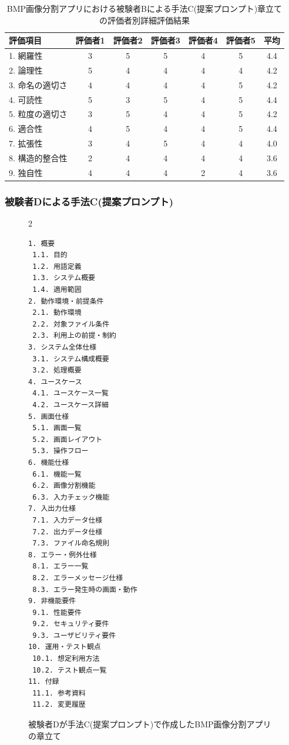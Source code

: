 \begin{table}[tp]
  \caption{BMP画像分割アプリにおける被験者Bによる手法C(提案プロンプト)章立ての評価者別詳細評価結果}
  \label{tb:detailed_evaluation_results_C}
  \centering
  \begin{tabular}{|l|c|c|c|c|c|c|}
    \hline
    \textbf{評価項目} & \textbf{評価者1} & \textbf{評価者2} & \textbf{評価者3} & \textbf{評価者4} & \textbf{評価者5} & \textbf{平均} \\
    \hline\hline
    1. 網羅性 & 3 & 5 & 5 & 4 & 5 & 4.4 \\
    \hline
    2. 論理性 & 5 & 4 & 4 & 4 & 4 & 4.2 \\
    \hline
    3. 命名の適切さ & 4 & 4 & 4 & 4 & 5 & 4.2 \\
    \hline
    4. 可読性 & 5 & 3 & 5 & 4 & 5 & 4.4 \\
    \hline
    5. 粒度の適切さ & 3 & 5 & 4 & 4 & 5 & 4.2 \\
    \hline
    6. 適合性 & 4 & 5 & 4 & 4 & 5 & 4.4 \\
    \hline
    7. 拡張性 & 3 & 4 & 5 & 4 & 4 & 4.0 \\
    \hline
    8. 構造的整合性 & 2 & 4 & 4 & 4 & 4 & 3.6 \\
    \hline
    9. 独自性 & 4 & 4 & 4 & 2 & 4 & 3.6 \\
    \hline
  \end{tabular}
\end{table}




\subsubsection{被験者Dによる手法C(提案プロンプト)}

\begin{figure}[tp]
\begin{tcolorbox}[
  colback=white,
  colframe=orange,
  fonttitle=\bfseries
]
\begin{multicols}{2}
\footnotesize
\ttfamily
\fontsize{8}{9}\selectfont
\begin{verbatim}
1. 概要
 1.1. 目的
 1.2. 用語定義
 1.3. システム概要
 1.4. 適用範囲
2. 動作環境・前提条件
 2.1. 動作環境
 2.2. 対象ファイル条件
 2.3. 利用上の前提・制約
3. システム全体仕様
 3.1. システム構成概要
 3.2. 処理概要
4. ユースケース
 4.1. ユースケース一覧
 4.2. ユースケース詳細
5. 画面仕様
 5.1. 画面一覧
 5.2. 画面レイアウト
 5.3. 操作フロー
6. 機能仕様
 6.1. 機能一覧
 6.2. 画像分割機能
 6.3. 入力チェック機能
7. 入出力仕様
 7.1. 入力データ仕様
 7.2. 出力データ仕様
 7.3. ファイル命名規則
8. エラー・例外仕様
 8.1. エラー一覧
 8.2. エラーメッセージ仕様
 8.3. エラー発生時の画面・動作
9. 非機能要件
 9.1. 性能要件
 9.2. セキュリティ要件
 9.3. ユーザビリティ要件
10. 運用・テスト観点
 10.1. 想定利用方法
 10.2. テスト観点一覧
11. 付録
 11.1. 参考資料
 11.2. 変更履歴
\end{verbatim}
\end{multicols}
\end{tcolorbox}
\caption{被験者Dが手法C(提案プロンプト)で作成したBMP画像分割アプリの章立て}
\label{fig:C_chapter_structure_of_bmp_app_2}
\end{figure}

